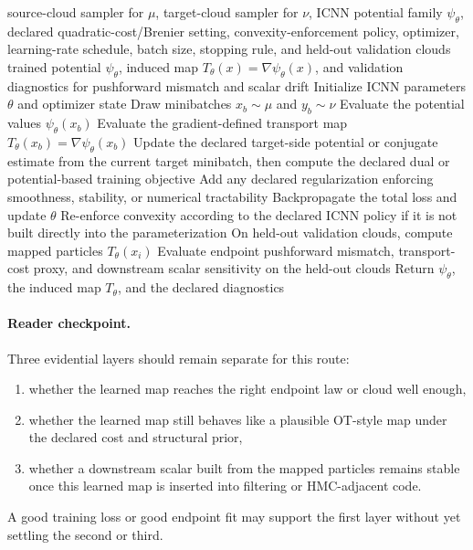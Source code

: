 \begin{algorithm}[ht]
\caption{\texttt{train\_icnn\_brenier\_map}}
\begin{algorithmic}[1]
\Require source-cloud sampler for \(\mu\), target-cloud sampler for \(\nu\), ICNN potential family \(\psi_\theta\), declared quadratic-cost/Brenier setting, convexity-enforcement policy, optimizer, learning-rate schedule, batch size, stopping rule, and held-out validation clouds
\Ensure trained potential \(\psi_\theta\), induced map \(T_\theta(x)=\nabla\psi_\theta(x)\), and validation diagnostics for pushforward mismatch and scalar drift
\State Initialize ICNN parameters \(\theta\) and optimizer state
  \State Draw minibatches \(x_b\sim\mu\) and \(y_b\sim\nu\)
  \State Evaluate the potential values \(\psi_\theta(x_b)\)
  \State Evaluate the gradient-defined transport map \(T_\theta(x_b)=\nabla\psi_\theta(x_b)\)
  \State Update the declared target-side potential or conjugate estimate from the current target minibatch, then compute the declared dual or potential-based training objective
  \State Add any declared regularization enforcing smoothness, stability, or numerical tractability
  \State Backpropagate the total loss and update \(\theta\)
  \State Re-enforce convexity according to the declared ICNN policy if it is not built directly into the parameterization
\EndWhile
  \State On held-out validation clouds, compute mapped particles \(T_\theta(x_i)\)
  \State Evaluate endpoint pushforward mismatch, transport-cost proxy, and downstream scalar sensitivity on the held-out clouds
  \State Return \(\psi_\theta\), the induced map \(T_\theta\), and the declared diagnostics
\end{algorithmic}
\end{algorithm}

\paragraph{Reader checkpoint.}
Three evidential layers should remain separate for this route:
\begin{enumerate}[label=(\roman*)]
  \item whether the learned map reaches the right endpoint law or cloud well enough,
  \item whether the learned map still behaves like a plausible OT-style map under
    the declared cost and structural prior,
  \item whether a downstream scalar built from the mapped particles remains stable
    once this learned map is inserted into filtering or HMC-adjacent code.
\end{enumerate}
A good training loss or good endpoint fit may support the first layer without yet
settling the second or third.

